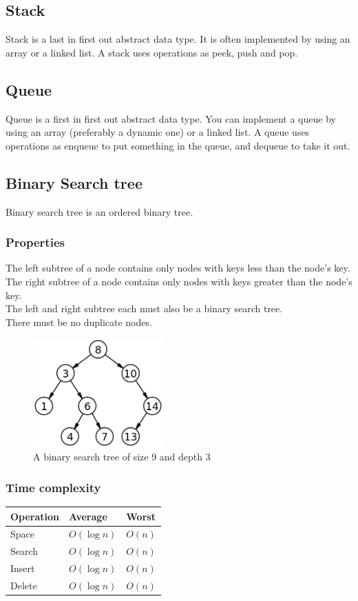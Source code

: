 \documentclass[a4paper, 10pt]{article}
\begin{document}
\subsection{Stack}
Stack is a last in first out abstract data type. It is often implemented by using an array or a linked list. A stack uses operations as peek, push and pop.

\subsection{Queue}
Queue is a first in first out abstract data type. You can implement a queue by using an array (preferably a dynamic one) or a linked list. A queue uses operations as enqueue to put something in the queue, and dequeue to take it out.

\subsection{Binary Search tree}
Binary search tree is an ordered binary tree.

\subsubsection{Properties}
The left subtree of a node contains only nodes with keys less than the node's key.\\
The right subtree of a node contains only nodes with keys greater than the node's key.\\
The left and right subtree each must also be a binary search tree.\\
There must be no duplicate nodes.\\

\begin{figure}[hbt]
    \begin{center}
        \includegraphics[width=5cm] {img/bst.png}
	\caption{A binary search tree of size 9 and depth 3}
    \end{center}
\end{figure}

\subsubsection{Time complexity}
\begin{tabular}{|l|l|l|}
    \hline
    Operation & Average & Worst \\ \hline
    Space     & $O(\log n)$       & $O(n)$     \\ \hline
    Search    & $O(\log n)$       & $O(n)$     \\ \hline
    Insert    & $O(\log n)$       & $O(n)$     \\ \hline
    Delete    & $O(\log n)$       & $O(n)$     \\ \hline
\end{tabular}
\end{document}
